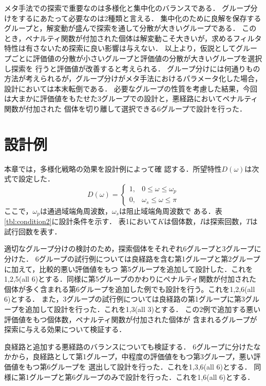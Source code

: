\documentclass[dvipdfmx,9pt]{ieej}
\begin{document}
メタ手法での探索で重要なのは多様化と集中化のバランスである．
グループ分けをするにあたって必要なのは2種類と言える．
集中化のために良解を保存するグループと，解変動が盛んで探索を通して分散が大きいグループである．
このとき，ペナルティ関数が付加された個体は解変動こそ大きいが，求めるフィルタ特性は有さないため探索に良い影響は与えない．
以上より，仮説としてグループごとに評価値の分散が小さいグループと評価値の分散が大きいグループを選択し探索を
行うと評価値が改善すると考えられる．
グループ分けには何通りもの方法が考えられるが，グループ分けがメタ手法におけるパラメータ化した場合，設計においては本末転倒である．
必要なグループの性質を考慮した結果，今回は大まかに評価値をもたせた3グループでの設計と，悪経路においてペナルティ関数が付加された
個体を切り離して選択できる6グループで設計を行った．

\section{設計例}
本章では，多様化戦略の効果を設計例によって確
認する．所望特性$D(\omega)$は次式で設定した．
\begin{equation}
 D(\omega)=\left\{
\begin{array}{ll}
 1, & 0\leq \omega \leq \omega_{p} \\
0, & \omega_{s}\leq \omega \leq \pi
\end{array}
\right.
\end{equation}
ここで，$\omega_{p}$は通過域端角周波数，$\omega_{s}$は阻止域端角周波数で
ある．表\ref{tbl:condition2}に設計条件を示す．
表1において$K$は個体数，$I$は探索回数，$T$は試行回数を表す．


適切なグループ分けの検討のため，探索個体をそれぞれ6グループと3グループに分けた．
6グループの試行例については良経路を含む第1グループと第2グループに加えて，比較的悪い評価値をもつ
第5グループを追加して設計した．これを1,2,5(all 6)とする．同様に第5グループのかわりにペナルティ関数が付加された
個体が多く含まれる第6グループを追加した例でも設計を行う。これを1,2,6(all 6)とする．
また，3グループの試行例については良経路の第1グループに第3グループを追加して設計を行った．これを1,3(all 3)とする．
この2例で追加する悪い評価値をもつ個体数，ペナルティ関数が付加された個体が
含まれるグループが探索に与える効果について検証する．

良経路と追加する悪経路のバランスについても検証する．
6グループに分けたなかから，良経路として第1グループ，中程度の評価値をもつ第3グループ，悪い評価値をもつ第6グループを
選出して設計を行った．これを1,3,6(all 6)とする．
同様に第1グループと第6グループのみで設計を行った．これを1,6(all 6)とする．
\end{document}
